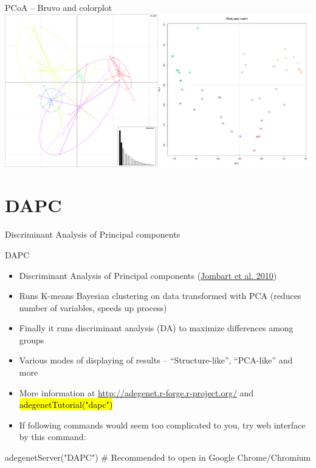 \documentclass[compress, ucs, xelatex, 11pt, xcolor=svgnames,
  hyperref={
    bookmarks=true,
    unicode=true,
    colorlinks=true,
    pdftitle={Molecular data in R},
    plainpages=false,
    pdfauthor={Vojtech Zeisek},
    pdfsubject={Course about phylogeny and evolution in R},
    pdfcreator={XeLaTeX},
    pdfkeywords={R, evolution, phylogeny, molecular data},
    linkcolor=Tomato,
    anchorcolor=SaddleBrown,
    citecolor=Goldenrod,
    filecolor=DarkMagenta,
    menucolor=Sienna,
    urlcolor=DarkTurquoise,
    pdftex},
  url={hyphens, lowtilde} %
  ]{beamer}
\renewcommand{\texttt}[1]{\hl{\ttfamily #1}}
\begin{document}
\begin{frame}{PCoA -- Bruvo and colorplot}
  \includegraphics[width=\textwidth]{pcoa-dalsi.png}
\end{frame}

\section{DAPC}

\begin{frame}{Discriminant Analysis of Principal components}
  \tableofcontents[currentsection, sectionstyle=show/hide, hideothersubsections]
\end{frame}

\begin{frame}[fragile]{DAPC}
  \label{DAPC}
  \begin{itemize}
    \item Discriminant Analysis of Principal components (\href{https://bmcgenet.biomedcentral.com/articles/10.1186/1471-2156-11-94}{Jombart et al. 2010})
    \item Runs K-means Bayesian clustering on data transformed with PCA (reduces number of variables, speeds up process)
    \item Finally it runs discriminant analysis (DA) to maximize differences among groups
    \item Various modes of displaying of results -- ``Structure-like'', ``PCA-like'' and more
    \item More information at \url{http://adegenet.r-forge.r-project.org/} and \texttt{adegenetTutorial("dapc")}
    \item If following commands would seem too complicated to you, try web interface by this command:
  \end{itemize}
  \begin{spluscode}
    adegenetServer("DAPC") # Recommended to open in Google Chrome/Chromium
  \end{spluscode}
\end{frame}
\end{document}
